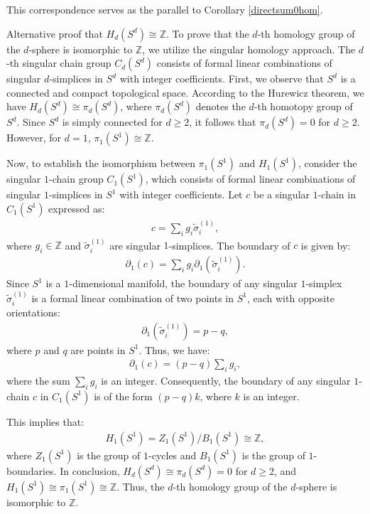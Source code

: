 This correspondence serves as the parallel to Corollary \ref{directsum0hom}.

\begin{example}
Alternative proof that \( H_{d}(S^{d}) \cong \mathbb{Z} \). To prove that the \( d \)-th homology group of the \( d \)-sphere is isomorphic to \(\mathbb{Z}\), we utilize the singular homology approach. The \( d \)-th singular chain group \( C_{d}(S^{d}) \) consists of formal linear combinations of singular \( d \)-simplices in \( S^{d} \) with integer coefficients. First, we observe that \( S^{d} \) is a connected and compact topological space. According to the Hurewicz theorem, we have \( H_{d}(S^{d}) \cong \pi_{d}(S^{d}) \), where \( \pi_{d}(S^{d}) \) denotes the \( d \)-th homotopy group of \( S^{d} \). Since \( S^{d} \) is simply connected for \( d \geq 2 \), it follows that \( \pi_{d}(S^{d}) = 0 \) for \( d \geq 2 \). However, for \( d = 1 \), \( \pi_{1}(S^{1}) \cong \mathbb{Z} \).

Now, to establish the isomorphism between \( \pi_{1}(S^{1}) \) and \( H_{1}(S^{1}) \), consider the singular \( 1 \)-chain group \( C_{1}(S^{1}) \), which consists of formal linear combinations of singular \( 1 \)-simplices in \( S^{1} \) with integer coefficients. Let \( c \) be a singular \( 1 \)-chain in \( C_{1}(S^{1}) \) expressed as:
\begin{align}
c = \sum_{i} g_{i} \tilde{\sigma}^{(1)}_{i},
\end{align}
where \( g_{i} \in \mathbb{Z} \) and \( \tilde{\sigma}^{(1)}_{i} \) are singular \( 1 \)-simplices. The boundary of \( c \) is given by:
\begin{align}
\partial_{1}(c) = \sum_{i} g_{i} \partial_{1}(\tilde{\sigma}^{(1)}_{i}).
\end{align}
Since \( S^{1} \) is a \( 1 \)-dimensional manifold, the boundary of any singular \( 1 \)-simplex \( \tilde{\sigma}^{(1)}_{i} \) is a formal linear combination of two points in \( S^{1} \), each with opposite orientations:
\begin{align}
\partial_{1}(\tilde{\sigma}^{(1)}_{i}) = p - q,
\end{align}
where \( p \) and \( q \) are points in \( S^{1} \). Thus, we have:
\begin{align}
\partial_{1}(c) = (p - q) \sum_{i} g_{i},
\end{align}
where the sum \( \sum_{i} g_{i} \) is an integer. Consequently, the boundary of any singular \( 1 \)-chain \( c \) in \( C_{1}(S^{1}) \) is of the form \( (p - q)k \), where \( k \) is an integer.

This implies that:
\begin{align}
H_{1}(S^{1}) = Z_{1}(S^{1}) / B_{1}(S^{1}) \cong \mathbb{Z},
\end{align}
where \( Z_{1}(S^{1}) \) is the group of \( 1 \)-cycles and \( B_{1}(S^{1}) \) is the group of \( 1 \)-boundaries. In conclusion, \( H_{d}(S^{d}) \cong \pi_{d}(S^{d}) = 0 \) for \( d \geq 2 \), and \( H_{1}(S^{1}) \cong \pi_{1}(S^{1}) \cong \mathbb{Z} \). Thus, the \( d \)-th homology group of the \( d \)-sphere is isomorphic to \(\mathbb{Z}\).
\end{example}


